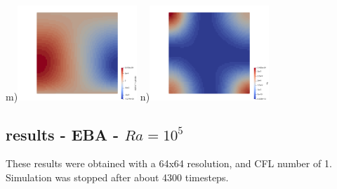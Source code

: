 \begin{center}
m)\includegraphics[width=4.5cm]{python_codes/fieldstone_compressible2/EBA_104/alpha_T_v_gradp.png}  
n)\includegraphics[width=4.5cm]{python_codes/fieldstone_compressible2/EBA_104/Phi.png}
\end{center}



\newpage
\subsection{results - EBA - $Ra=10^5$}

These results were obtained with a 64x64 resolution, and CFL number of 1. Simulation 
 was stopped after about 4300 timesteps. 

